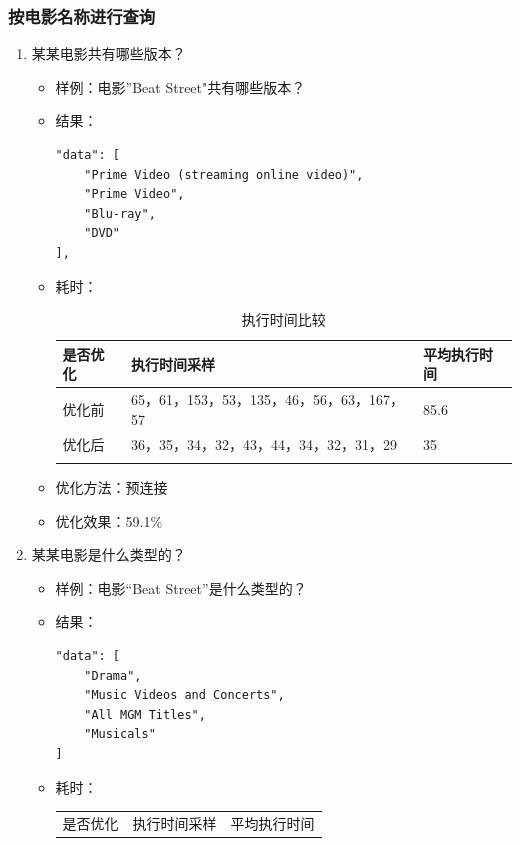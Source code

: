 \documentclass{ctexrep}
\begin{document}
	\subsubsection{按电影名称进行查询}
	    \begin{enumerate}
	        \item 某某电影共有哪些版本？
    	        \begin{itemize}
    	            \item 样例：电影”Beat Street"共有哪些版本？
    	            \item 结果：
    	                \begin{lstlisting}
"data": [
    "Prime Video (streaming online video)",
    "Prime Video",
    "Blu-ray",
    "DVD"
],
    	                \end{lstlisting}
    	            \item 耗时：
    	                \begin{longtable}{l|p{5cm}|l}
    	                    \hline
    	                    是否优化 & 执行时间采样 & 平均执行时间\\
    	                    \hline
    	                    \hline
    	                    优化前 & 65，61，153，53，135，46，56，63，167，57 & 85.6\\
    	                    优化后 & 36，35，34，32，43，44，34，32，31，29 & 35\\
    	                    \hline
    	                    \caption{执行时间比较}
    	                \end{longtable}
    	            \item 优化方法：预连接
    	            \item 优化效果：59.1\%
    	        \end{itemize}
    	    \item 某某电影是什么类型的？
    	        \begin{itemize}
    	            \item 样例：电影“Beat Street”是什么类型的？
    	            \item 结果：
    	                \begin{lstlisting}
"data": [
    "Drama",
    "Music Videos and Concerts",
    "All MGM Titles",
    "Musicals"
]
    	                \end{lstlisting}
    	            \item 耗时：
    	                \begin{longtable}{l|p{5cm}|l}
    	                    \hline
    	                    是否优化 & 执行时间采样 & 平均执行时间\\

\end{longtable}
\end{itemize}
\end{enumerate}
\end{document}
